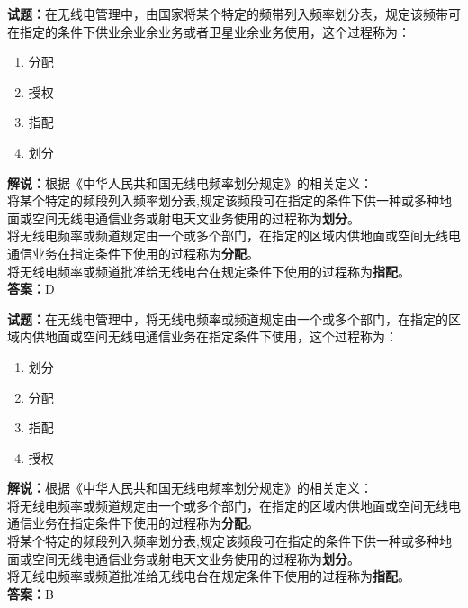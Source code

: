 \documentclass{ctexbook}
\begin{document}
\vspace{\baselineskip}

\noindent\textbf{试题：}在无线电管理中，由国家将某个特定的频带列入频率划分表，规定该频带可在指定的条件下供业余业余业务或者卫星业余业务使用，这个过程称为：
\begin{enumerate}[leftmargin=3em]
  \item 分配
  \item 授权
  \item 指配
  \item 划分
\end{enumerate}
\noindent\textbf{解说：}根据《中华人民共和国无线电频率划分规定》的相关定义：\\将某个特定的频段列入频率划分表,规定该频段可在指定的条件下供一种或多种地面或空间无线电通信业务或射电天文业务使用的过程称为\textbf{划分}。\\将无线电频率或频道规定由一个或多个部门，在指定的区域内供地面或空间无线电通信业务在指定条件下使用的过程称为\textbf{分配}。\\将无线电频率或频道批准给无线电台在规定条件下使用的过程称为\textbf{指配}。\\
\textbf{答案：}D

\vspace{\baselineskip}

\noindent\textbf{试题：}在无线电管理中，将无线电频率或频道规定由一个或多个部门，在指定的区域内供地面或空间无线电通信业务在指定条件下使用，这个过程称为：
\begin{enumerate}[leftmargin=3em]
  \item 划分
  \item 分配
  \item 指配
  \item 授权
\end{enumerate}
\noindent\textbf{解说：}根据《中华人民共和国无线电频率划分规定》的相关定义：\\将无线电频率或频道规定由一个或多个部门，在指定的区域内供地面或空间无线电通信业务在指定条件下使用的过程称为\textbf{分配}。\\将某个特定的频段列入频率划分表,规定该频段可在指定的条件下供一种或多种地面或空间无线电通信业务或射电天文业务使用的过程称为\textbf{划分}。\\将无线电频率或频道批准给无线电台在规定条件下使用的过程称为\textbf{指配}。\\
\textbf{答案：}B

\vspace{\baselineskip}
\end{document}
